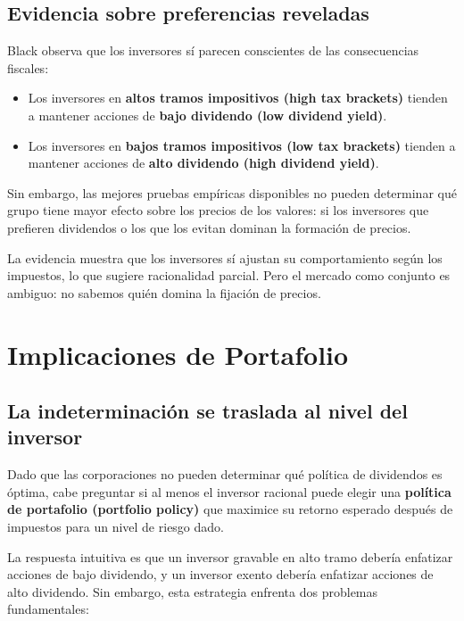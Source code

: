 \documentclass[12pt]{article}
\begin{document}
\subsection{Evidencia sobre preferencias reveladas}

Black observa que los inversores s\'i parecen conscientes de las consecuencias fiscales:
\begin{itemize}
  \item Los inversores en \textbf{altos tramos impositivos (high tax brackets)} tienden a mantener acciones de \textbf{bajo dividendo (low dividend yield)}.
  \item Los inversores en \textbf{bajos tramos impositivos (low tax brackets)} tienden a mantener acciones de \textbf{alto dividendo (high dividend yield)}.
\end{itemize}
Sin embargo, las mejores pruebas emp\'iricas disponibles no pueden determinar qu\'e grupo tiene mayor efecto sobre los precios de los valores: si los inversores que prefieren dividendos o los que los evitan dominan la formaci\'on de precios.

\begin{intuicion}
La evidencia muestra que los inversores s\'i ajustan su comportamiento seg\'un los impuestos, lo que sugiere racionalidad parcial. Pero el mercado como conjunto es ambiguo: no sabemos qui\'en domina la fijaci\'on de precios.
\end{intuicion}

\section{Implicaciones de Portafolio}

\subsection{La indeterminaci\'on se traslada al nivel del inversor}

Dado que las corporaciones no pueden determinar qu\'e pol\'itica de dividendos es \'optima, cabe preguntar si al menos el inversor racional puede elegir una \textbf{pol\'itica de portafolio (portfolio policy)} que maximice su retorno esperado despu\'es de impuestos para un nivel de riesgo dado.

La respuesta intuitiva es que un inversor gravable en alto tramo deber\'ia enfatizar acciones de bajo dividendo, y un inversor exento deber\'ia enfatizar acciones de alto dividendo. Sin embargo, esta estrategia enfrenta dos problemas fundamentales:
\end{document}
